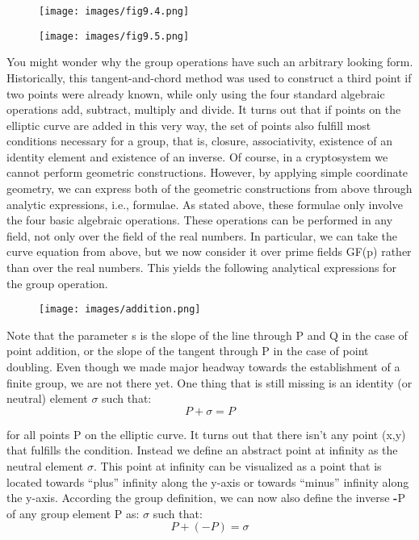 \documentclass{article}
\begin{document}
\begin{figure}[h]
	\begin{center}
  		\texttt{[image: images/fig9.4.png]}
 	\end{center}
\end{figure}

\begin{figure}[h]
	\begin{center}
  		\texttt{[image: images/fig9.5.png]}
 	\end{center}
\end{figure}

You might wonder why the group operations have such an arbitrary looking form.
Historically, this tangent-and-chord method was used to construct a third point if
two points were already known, while only using the four standard algebraic operations
add, subtract, multiply and divide. It turns out that if points on the elliptic
curve are added in this very way, the set of points also fulfill most conditions necessary
for a group, that is, closure, associativity, existence of an identity element and
existence of an inverse.
Of course, in a cryptosystem we cannot perform geometric constructions. However,
by applying simple coordinate geometry, we can express both of the geometric constructions from above through analytic expressions, i.e., formulae. As stated
above, these formulae only involve the four basic algebraic operations. These operations
can be performed in any field, not only over the field of the real numbers. In particular, we can take the curve equation from above, but we now
consider it over prime fields GF(p) rather than over the real numbers. This yields
the following analytical expressions for the group operation.

\begin{figure}[h]
	\begin{center}
  		\texttt{[image: images/addition.png]}
 	\end{center}
\end{figure}

Note that the parameter s is the slope of the line through P and Q in the case of
point addition, or the slope of the tangent through P in the case of point doubling.
Even though we made major headway towards the establishment of a finite group,
we are not there yet. One thing that is still missing is an identity (or neutral) element
${\sigma}$ such that: $${P + \sigma = P}$$

for all points P on the elliptic curve. It turns out that there isn’t any point (x,y) that
fulfills the condition. Instead we define an abstract point at infinity as the neutral
element ${\sigma}$. This point at infinity can be visualized as a point that is located towards
“plus” infinity along the y-axis or towards “minus” infinity along the y-axis.
According the group definition, we can now also define the inverse \textbf{-}P of any
group element P as:
${\sigma}$ such that: $${P + (-P) = \sigma}$$
\end{document}

